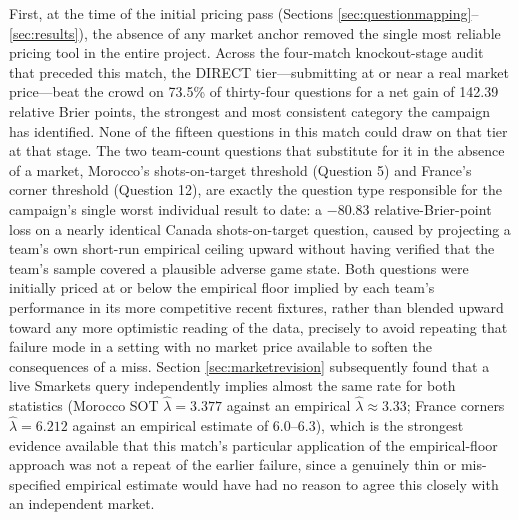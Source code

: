 \documentclass[11pt]{article}
\begin{document}
First, at the time of the initial pricing pass (Sections \ref{sec:questionmapping}--
\ref{sec:results}), the absence of any market anchor removed the single most reliable
pricing tool in the entire project. Across the four-match knockout-stage audit that
preceded this match, the DIRECT tier---submitting at or near a real market price---beat
the crowd on 73.5\% of thirty-four questions for a net gain of 142.39 relative Brier
points, the strongest and most consistent category the campaign has identified. None of
the fifteen questions in this match could draw on that tier at that stage. The two
team-count questions that substitute for it in the absence of a market, Morocco's
shots-on-target threshold (Question 5) and France's corner threshold (Question 12), are
exactly the question type responsible for the campaign's single worst individual result
to date: a $-80.83$ relative-Brier-point loss on a nearly identical Canada
shots-on-target question, caused by projecting a team's own short-run empirical ceiling
upward without having verified that the team's sample covered a plausible adverse game
state. Both questions were initially priced at or below the empirical floor implied by
each team's performance in its more competitive recent fixtures, rather than blended
upward toward any more optimistic reading of the data, precisely to avoid repeating that
failure mode in a setting with no market price available to soften the consequences of a
miss. Section \ref{sec:marketrevision} subsequently found that a live Smarkets query
independently implies almost the same rate for both statistics (Morocco SOT $\hat\lambda
= 3.377$ against an empirical $\hat\lambda \approx 3.33$; France corners $\hat\lambda =
6.212$ against an empirical estimate of 6.0--6.3), which is the strongest evidence
available that this match's particular application of the empirical-floor approach was
not a repeat of the earlier failure, since a genuinely thin or mis-specified empirical
estimate would have had no reason to agree this closely with an independent market.
\end{document}
